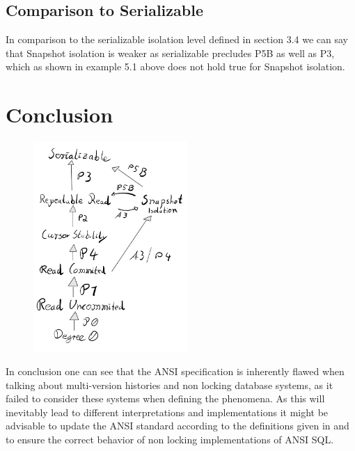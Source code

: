 \documentclass[sigconf, review=true]{acmart}
\begin{document}
\subsection{Comparison to Serializable}
In comparison to the serializable isolation level defined in section 3.4 we can say that Snapshot isolation is
weaker as serializable precludes P5B as well as P3, which as shown in example 5.1 above does not hold true
for Snapshot isolation.
\section{Conclusion}
\includegraphics[width=8cm, height=8cm]{iso_lvl_dia.png}

In conclusion one can see that the ANSI specification is inherently flawed when talking
about multi-version histories and non locking database systems, as it failed to consider
these systems when defining the phenomena. As this will inevitably lead to different interpretations
and implementations it might be advisable to update the ANSI standard
according to the definitions given in \cite{Adya_Liskov_O_Neil_2000} and \cite{Berenson_Bernstein_Gray_Melton_O_Neil_O_Neil_1995}
to ensure the correct behavior of non locking implementations of ANSI SQL.


\end{document}
